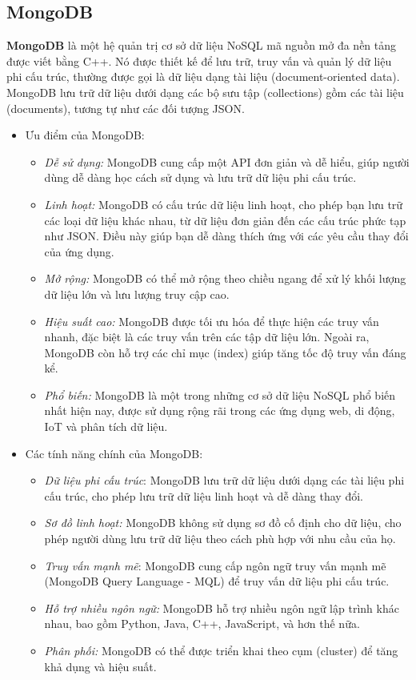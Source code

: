 \subsection{MongoDB}
\textbf{MongoDB} là một hệ quản trị cơ sở dữ liệu NoSQL mã nguồn mở đa nền tảng được viết bằng C++. Nó được thiết kế để lưu trữ, truy vấn và quản lý dữ liệu phi cấu trúc, thường được gọi là dữ liệu dạng tài liệu (document-oriented data). MongoDB lưu trữ dữ liệu dưới dạng các bộ sưu tập (collections) gồm các tài liệu (documents), tương tự như các đối tượng JSON.
\begin{itemize}
    \item Ưu điểm của MongoDB:

        \begin{itemize}
            \item \textit{Dễ sử dụng:} MongoDB cung cấp một API đơn giản và dễ hiểu, giúp người dùng dễ dàng học cách sử dụng và lưu trữ dữ liệu phi cấu trúc.
            \item \textit{Linh hoạt:} MongoDB có cấu trúc dữ liệu linh hoạt, cho phép bạn lưu trữ các loại dữ liệu khác nhau, từ dữ liệu đơn giản đến các cấu trúc phức tạp như JSON. Điều này giúp bạn dễ dàng thích ứng với các yêu cầu thay đổi của ứng dụng.
            \item \textit{Mở rộng:} MongoDB có thể mở rộng theo chiều ngang để xử lý khối lượng dữ liệu lớn và lưu lượng truy cập cao. 
            \item \textit{Hiệu suất cao:} MongoDB được tối ưu hóa để thực hiện các truy vấn nhanh, đặc biệt là các truy vấn trên các tập dữ liệu lớn. Ngoài ra, MongoDB còn hỗ trợ các chỉ mục (index) giúp tăng tốc độ truy vấn đáng kể.
            \item \textit{Phổ biến:} MongoDB là một trong những cơ sở dữ liệu NoSQL phổ biến nhất hiện nay, được sử dụng rộng rãi trong các ứng dụng web, di động, IoT và phân tích dữ liệu.
        \end{itemize}

    \item Các tính năng chính của MongoDB:
        \begin{itemize}
            \item \textit{Dữ liệu phi cấu trúc}: MongoDB lưu trữ dữ liệu dưới dạng các tài liệu phi cấu trúc, cho phép lưu trữ dữ liệu linh hoạt và dễ dàng thay đổi.
            \item \textit{Sơ đồ linh hoạt:} MongoDB không sử dụng sơ đồ cố định cho dữ liệu, cho phép người dùng lưu trữ dữ liệu theo cách phù hợp với nhu cầu của họ.
            \item \textit{Truy vấn mạnh mẽ}: MongoDB cung cấp ngôn ngữ truy vấn mạnh mẽ (MongoDB Query Language - MQL) để truy vấn dữ liệu phi cấu trúc.
            \item \textit{Hỗ trợ nhiều ngôn ngữ:} MongoDB hỗ trợ nhiều ngôn ngữ lập trình khác nhau, bao gồm Python, Java, C++, JavaScript, và hơn thế nữa.
            \item \textit{Phân phối:} MongoDB có thể được triển khai theo cụm (cluster) để tăng khả dụng và hiệu suất.
        \end{itemize}
\end{itemize}

